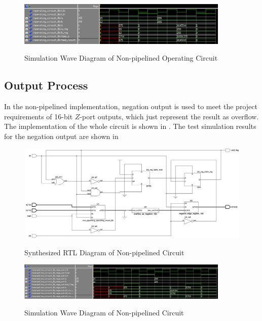 \begin{figure}[!htp]
	\centering
	\caption{Simulation Wave Diagram of Non-pipelined Operating Circuit}
	\includegraphics[width=0.9\textwidth]{../img/non_p_op_sim.png}
	\label{fig:non_p_op_sim}
\end{figure}

\subsection{Output Process}

In the non-pipelined implementation, negation output is used to meet the project requirements of 16-bit \(Z\)-port outputs,
which just represent the result as overflow.
The implementation of the whole circuit is shown in .
The test simulation results for the negation output are shown in 

\begin{figure}[!htp]
	\centering
	\caption{Synthesized RTL Diagram of Non-pipelined Circuit}
	\includegraphics[width=\textwidth]{../img/non_p_rtl.png}
	\label{fig:non_p_rtl}
\end{figure}

\begin{figure}[!htp]
	\centering
	\caption{Simulation Wave Diagram of Non-pipelined Circuit}
	\includegraphics[width=0.9\textwidth]{../img/non_p_sim.png}
	\label{fig:non_p_sim}
\end{figure}
